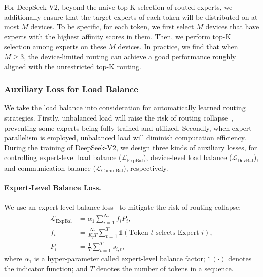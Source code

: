 \documentclass[11pt, a4paper, logo, copyright, nonumbering]{deepseek}
\newcommand{\dsvii}{DeepSeek-V2}
\begin{document}
\begin{CJK*}{UTF8}{gbsn}
For \dsvii{}, beyond the naive top-K selection of routed experts, we additionally ensure that the target experts of each token will be distributed on at most $M$ devices. 
To be specific, for each token, we first select $M$ devices that have experts with the highest affinity scores in them. 
Then, we perform top-K selection among experts on these $M$ devices. 
In practice, we find that when $M \geq 3$, the device-limited routing can achieve a good performance roughly aligned with the unrestricted top-K routing. 

\subsubsection{Auxiliary Loss for Load Balance}

We take the load balance into consideration for automatically learned routing strategies. 
Firstly, unbalanced load will raise the risk of routing collapse~\citep{moe}, preventing some experts being fully trained and utilized. 
Secondly, when expert parallelism is employed, unbalanced load will diminish computation efficiency. 
During the training of \dsvii{}, we design three kinds of auxiliary losses, for controlling expert-level load balance ($\mathcal{L}_{\mathrm{ExpBal}}$), device-level load balance ($\mathcal{L}_{\mathrm{DevBal}}$), and communication balance ($\mathcal{L}_{\mathrm{CommBal}}$), respectively. 

\paragraph{Expert-Level Balance Loss.}
We use an expert-level balance loss~\citep{switch,gshard} to mitigate the risk of routing collapse:
\begin{align}
    \mathcal{L}_{\mathrm{ExpBal}} & = \alpha_1 \sum_{i=1}^{N_r}{f_i P_i}, \\
    f_i & = \frac{N_r}{K_r T} \sum_{t=1}^{T}{ \mathds{1}( \text{Token $t$ selects Expert $i$} )}, \\
    P_i & = \frac{1}{T} \sum_{t=1}^{T}{s_{i,t}},
\end{align}
where $\alpha_1$ is a hyper-parameter called expert-level balance factor; 
$\mathds{1}(\cdot)$ denotes the indicator function; 
and $T$ denotes the number of tokens in a sequence. 


\end{CJK*}
\end{document}
